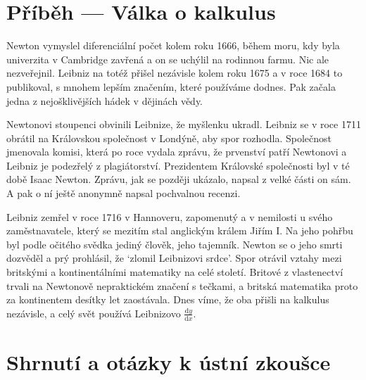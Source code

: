 \section{Příběh --- Válka o kalkulus}

Newton vymyslel diferenciální počet kolem roku 1666, během moru, kdy byla univerzita v Cambridge zavřená a on se uchýlil na rodinnou farmu. Nic ale nezveřejnil. Leibniz na totéž přišel nezávisle kolem roku 1675 a v roce 1684 to publikoval, s mnohem lepším značením, které používáme dodnes. Pak začala jedna z nejošklivějších hádek v dějinách vědy.

Newtonovi stoupenci obvinili Leibnize, že myšlenku ukradl. Leibniz se v roce 1711 obrátil na Královskou společnost v Londýně, aby spor rozhodla. Společnost jmenovala komisi, která po roce vydala zprávu, že prvenství patří Newtonovi a Leibniz je podezřelý z plagiátorství. Prezidentem Královské společnosti byl v té době Isaac Newton. Zprávu, jak se později ukázalo, napsal z velké části on sám. A pak o ní ještě anonymně napsal pochvalnou recenzi.

Leibniz zemřel v roce 1716 v Hannoveru, zapomenutý a v nemilosti u svého zaměstnavatele, který se mezitím stal anglickým králem Jiřím I. Na jeho pohřbu byl podle očitého svědka jediný člověk, jeho tajemník. Newton se o jeho smrti dozvěděl a prý prohlásil, že `zlomil Leibnizovi srdce'. Spor otrávil vztahy mezi britskými a kontinentálními matematiky na celé století. Britové z vlastenectví trvali na Newtonově nepraktickém značení s tečkami, a britská matematika proto za kontinentem desítky let zaostávala. Dnes víme, že oba přišli na kalkulus nezávisle, a celý svět používá Leibnizovo $\frac{\mathrm{d}y}{\mathrm{d}x}$.

\section{Shrnutí a otázky k ústní zkoušce}

